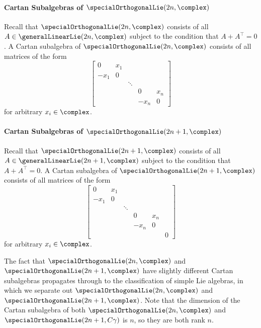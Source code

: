 \documentclass[fleqn]{NotesClass}
\newcommand{\trans}{{\top}}
\begin{document}
    \paragraph{Cartan Subalgebras of \(\specialOrthogonalLie(2n, \complex)\)}
    Recall that \(\specialOrthogonalLie(2n, \complex)\) consists of all \(A \in \generalLinearLie(2n, \complex)\) subject to the condition that \(A + A^{\trans} = 0\).
    A Cartan subalgebra of \(\specialOrthogonalLie(2n, \complex)\) consists of all matrices of the form
    \begin{equation}
        \begin{bmatrix}
            0 & x_1\\
            -x_1 & 0\\
            && \ddots\\
            &&& 0 & x_n\\
            &&& -x_n & 0
        \end{bmatrix}
    \end{equation}
    for arbitrary \(x_i \in \complex\).
    
    \paragraph{Cartan Subalgebras of \(\specialOrthogonalLie(2n + 1, \complex)\)}
    Recall that \(\specialOrthogonalLie(2n + 1, \complex)\) consists of all \(A \in \generalLinearLie(2n + 1, \complex)\) subject to the condition that \(A + A^{\trans} = 0\).
    A Cartan subalgebra of \(\specialOrthogonalLie(2n + 1, \complex)\) consists of all matrices of the form
    \begin{equation}
        \begin{bmatrix}{}
            0 & x_1\\
            -x_1 & 0\\
            && \ddots\\
            &&& 0 & x_n\\
            &&& -x_n & 0\\
            &&&&& 0
        \end{bmatrix}
    \end{equation}
    for arbitrary \(x_i \in \complex\).
    
    The fact that \(\specialOrthogonalLie(2n, \complex)\) and \(\specialOrthogonalLie(2n + 1, \complex)\) have slightly different Cartan subalgebras propagates through to the classification of simple Lie algebras, in which we separate out \(\specialOrthogonalLie(2n, \complex)\) and \(\specialOrthogonalLie(2n + 1, \complex)\).
    Note that the dimension of the Cartan subalgebra of both \(\specialOrthogonalLie(2n, \complex)\) and \(\specialOrthogonalLie(2n + 1, C\gamma)\) is \(n\), so they are both rank \(n\).
    
\end{document}
